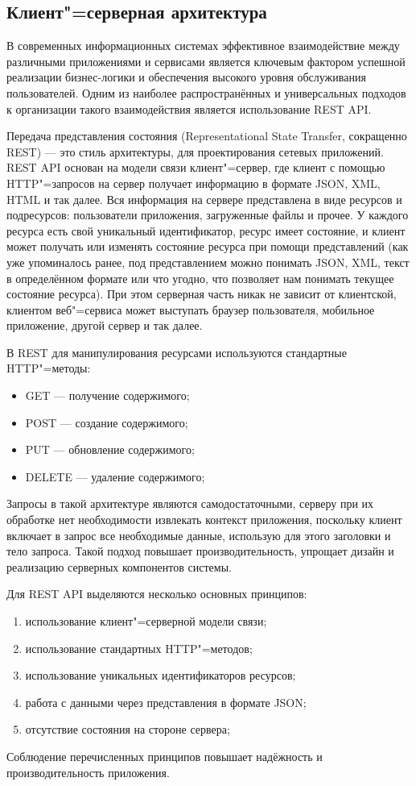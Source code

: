 \subsection{Клиент"=серверная архитектура}

В современных информационных системах эффективное взаимодействие между различными приложениями и сервисами является ключевым фактором успешной реализации бизнес-логики и обеспечения высокого уровня обслуживания пользователей. Одним из наиболее распространённых и универсальных подходов к организации такого взаимодействия является использование REST API.

Передача представления состояния (Representational State Transfer, сокращенно REST) --- это стиль архитектуры, для проектирования сетевых приложений. REST API основан на модели связи клиент"=сервер, где клиент с помощью HTTP"=запросов на сервер получает информацию в формате JSON, XML, HTML и так далее. Вся информация на сервере представлена в виде ресурсов и подресурсов: пользователи приложения, загруженные файлы и прочее. У каждого ресурса есть свой уникальный идентификатор, ресурс имеет состояние, и клиент может получать или изменять состояние ресурса при помощи представлений (как уже упоминалось ранее, под представлением можно понимать JSON, XML, текст в определённом формате или что угодно, что позволяет нам понимать текущее состояние ресурса). При этом серверная часть никак не зависит от клиентской, клиентом веб"=сервиса может выступать браузер пользователя, мобильное приложение, другой сервер и так далее.

В REST для манипулирования ресурсами используются стандартные HTTP"=методы:
\begin{itemize}
	\item{GET --- получение содержимого;}
	\item{POST --- создание содержимого;}
	\item{PUT --- обновление содержимого;}
	\item{DELETE --- удаление содержимого;}
\end{itemize}

Запросы в такой архитектуре являются самодостаточными, серверу при их обработке нет необходимости извлекать контекст приложения, поскольку клиент включает в запрос все необходимые данные, использую для этого заголовки и тело запроса. Такой подход повышает производительность, упрощает дизайн и реализацию серверных компонентов системы.

Для REST API выделяются несколько основных принципов:
\begin{enumerate}
	\item{использование клиент"=серверной модели связи;}
	\item{использование стандартных HTTP"=методов;}
	\item{использование уникальных идентификаторов ресурсов;}
	\item{работа с данными через представления в формате JSON;}
	\item{отсутствие состояния на стороне сервера;}
\end{enumerate}

Соблюдение перечисленных принципов повышает надёжность и производительность приложения.
